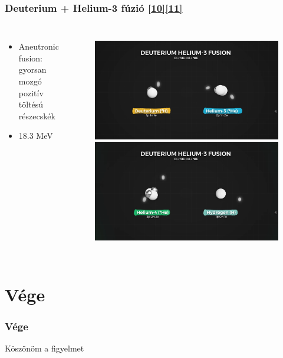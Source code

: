 \documentclass{beamer}
\begin{document}
\begin{frame}
    \frametitle{Deuterium + Helium-3 fúzió \hyperlink{10}{\small[10]}\hyperlink{11}{\small[11]}}
    \begin{columns}
        \begin{itemize}
            \item Aneutronic fusion: gyorsan mozgó pozitív töltésú részecskék
            \item 18.3 MeV
        \end{itemize}
        \begin{figure}
            \includegraphics[scale=0.09]{d_h3_fusion.png}
            \includegraphics[scale=0.09]{d_h3_fusion_2.png}
        \end{figure}   
    \end{columns}
\end{frame}

\section{Vége}
\begin{frame}
    \frametitle{Vége}
    \centering
    \Huge Köszönöm a figyelmet
\end{frame}
\end{document}
